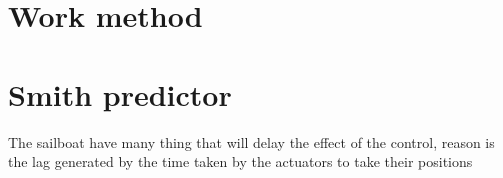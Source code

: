 
\section{Work method}

\section{Smith predictor}

The sailboat have many thing that will delay the effect of the control,
reason is the lag generated by the time taken by the actuators to take their positions
